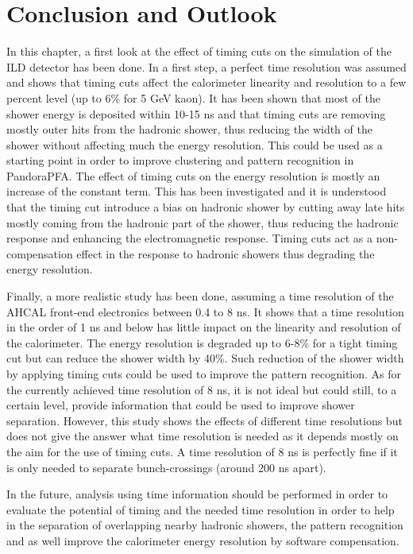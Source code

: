 \section{Conclusion and Outlook}

In this chapter, a first look at the effect of timing cuts on the \geant simulation of the ILD detector has been done. In a first step, a perfect time resolution was assumed and shows that timing cuts affect the calorimeter linearity and resolution to a few percent level (up to 6\% for 5 GeV kaon). It has been shown that most of the shower energy is deposited within 10-15 ns and that timing cuts are removing mostly outer hits from the hadronic shower, thus reducing the width of the shower without affecting much the energy resolution. This could be used as a starting point in order to improve clustering and pattern recognition in PandoraPFA. The effect of timing cuts on the energy resolution is mostly an increase of the constant term. This has been investigated and it is understood that the timing cut introduce a bias on hadronic shower by cutting away late hits mostly coming from the hadronic part of the shower, thus reducing the hadronic response and enhancing the electromagnetic response. Timing cuts act as a non-compensation effect in the response to hadronic showers thus degrading the energy resolution.

Finally, a more realistic study has been done, assuming a time resolution of the AHCAL front-end electronics between 0.4 to 8 ns. It shows that a time resolution in the order of 1 ns and below has little impact on the linearity and resolution of the calorimeter. The energy resolution is degraded up to 6-8\% for a tight timing cut but can reduce the shower width by 40\%. Such reduction of the shower width by applying timing cuts could be used to improve the pattern recognition. As for the currently achieved time resolution of 8 ns, it is not ideal but could still, to a certain level, provide information that could be used to improve shower separation. However, this study shows the effects of different time resolutions but does not give the answer what time resolution is needed as it depends mostly on the aim for the use of timing cuts. A time resolution of 8 ns is perfectly fine if it is only needed to separate bunch-crossings (around 200 ns apart). 

In the future, analysis using time information should be performed in order to evaluate the potential of timing and the needed time resolution in order to help in the separation of overlapping nearby hadronic showers, the pattern recognition and as well improve the calorimeter energy resolution by software compensation.
